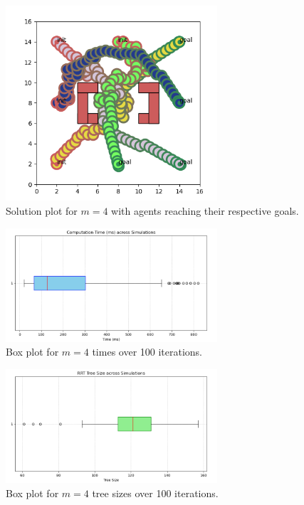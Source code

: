 \documentclass{article}
\begin{document}
\begin{figure}[H]
    \centering
    \includegraphics[width=0.7\textwidth]{1b4plot.png} 
    \caption{Solution plot for \(m = 4\) with agents reaching their respective goals.}
    \label{fig:1b4plot}
\end{figure}

\begin{figure}[H]
    \centering
    \includegraphics[width=0.7\textwidth]{1c4time.png} 
    \caption{Box plot for \(m = 4\) times over 100 iterations.}
    \label{fig:ic4time}
\end{figure}

\begin{figure}[H]
    \centering
    \includegraphics[width=0.7\textwidth]{1c4size.png} 
    \caption{Box plot for \(m = 4\) tree sizes over 100 iterations.}
    \label{fig:ic4size}
\end{figure}
\end{document}

